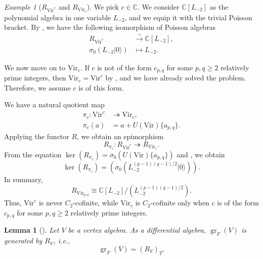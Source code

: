 \documentclass[a4paper, 12pt, reqno]{amsart}
\newtheorem{lemma}[theorem]{Lemma}
\theoremstyle{remark}
\newtheorem{example}[theorem]{Example}
\DeclareMathOperator{\gr}{gr}
\newcommand{\vac}{{|0\rangle}}
\newcommand{\Vir}{{\mathrm{Vir}}}
\begin{document}
\begin{example}[$R_{\Vir^c}$ and $R_{\Vir_c}$]
  \label{exa:6}
  We pick $c \in \mathbb{C}$.
  We consider $\mathbb{C}[L_{-2}]$ as the polynomial algebra in one variable $L_{-2}$, and we equip it with the trivial Poisson bracket.
  By , we have the following isomorphism of Poisson algebras
  \begin{align*}
    R_{\Vir^c} &\xrightarrow{\sim} \mathbb{C}[L_{-2}], \\
    \sigma_0(L_{-2}\vac) &\mapsto L_{-2}.
  \end{align*}

  We now move on to $\Vir_c$.
  If $c$ is not of the form $c_{p, q}$ for some $p, q \ge 2$ relatively prime integers, then $\Vir_c = \Vir^c$ by , and we have already solved the problem.
  Therefore, we assume $c$ is of this form.

  We have a natural quotient map
  \begin{align*}
    \pi_c: \Vir^c &\twoheadrightarrow \Vir_c, \\
    \pi_c(a) &= a + U(\Vir)\{a_{p, q}\}.
  \end{align*}
  Applying the functor $R$, we obtain an epimorphism
  \begin{equation*}
    R_{\pi_c}: R_{\Vir^c} \twoheadrightarrow R_{\Vir_c}.
  \end{equation*}
  From the equation $\ker(R_{\pi_c}) = \sigma_0(U(\Vir)\{a_{p, q}\})$ and , we obtain
  \begin{equation*}
    \ker(R_{\pi_c}) = (\sigma_0(L_{-2}^{(p - 1)(q - 1)/2}\vac)).
  \end{equation*}
  In summary,
  \begin{equation*}
    R_{\Vir_{p, q}} \cong \mathbb{C}[L_{-2}]/(L_{-2}^{(p - 1)(q - 1)/2}).
  \end{equation*}
  Thus, $\Vir^c$ is never $C_2$-cofinite, while $\Vir_c$ is $C_2$-cofinite only when $c$ is of the form $c_{p, q}$ for some $p, q \ge 2$ relatively prime integers.
\end{example}

\begin{lemma}[{\cite[Corollary 4.3]{li_abelianizing_2005}}]
  \label{lmm:7}
  Let $V$ be a vertex algebra.
  As a differential algebra, $\gr_F(V)$ is generated by $R_V$, i.e.,
  \begin{equation*}
    \gr_F(V) = (R_V)_T.
  \end{equation*}
\end{lemma}
\end{document}
